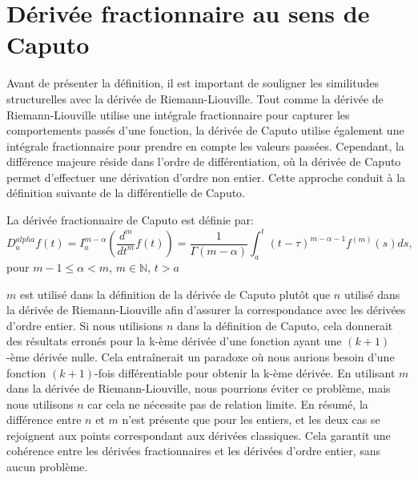 \section{Dérivée fractionnaire au sens de Caputo}
Avant de présenter la définition, il est important de souligner les similitudes structurelles avec la dérivée de Riemann-Liouville. Tout comme la dérivée de Riemann-Liouville utilise une intégrale fractionnaire pour capturer les comportements passés d'une fonction, la dérivée de Caputo utilise également une intégrale fractionnaire pour prendre en compte les valeurs passées. Cependant, la différence majeure réside dans l'ordre de différentiation, où la dérivée de Caputo permet d'effectuer une dérivation d'ordre non entier. Cette approche conduit à la définition suivante de la différentielle de Caputo. \cite{FDE&applications}

\begin{definition}
    La dérivée fractionnaire de Caputo est définie par:
    \begin{equation}\label{eq:der_frac_caputo}
        D_a^{alpha} f(t) = I_a^{m-\alpha}\left(\frac{d^m}{dt^m} f(t) \right) = \frac{1}{\Gamma(m-\alpha)}\int_a^t (t-\tau)^{m-\alpha -1} f^{(m)} (s)ds,
    \end{equation}
    pour $m-1\leq\alpha<m$, $m\in \mathbb{N}$, $t>a$
\end{definition}
$m$ est utilisé dans la définition de la dérivée de Caputo plutôt que $n$ utilisé dans la dérivée de Riemann-Liouville afin d'assurer la correspondance avec les dérivées d'ordre entier. 
Si nous utilisions $n$ dans la définition de Caputo, cela donnerait des résultats erronés pour la k-ème dérivée d'une fonction ayant une $(k + 1)$-ème dérivée nulle. Cela entraînerait un paradoxe où nous aurions besoin d'une fonction $(k + 1)$-fois différentiable pour obtenir la k-ème dérivée. En utilisant $m$ dans la dérivée de Riemann-Liouville, nous pourrions éviter ce problème, mais nous utilisons $n$ car cela ne nécessite pas de relation limite. En résumé, la différence entre $n$ et $m$ n'est présente que pour les entiers, et les deux cas se rejoignent aux points correspondant aux dérivées classiques. Cela garantit une cohérence entre les dérivées fractionnaires et les dérivées d'ordre entier, sans aucun problème.

